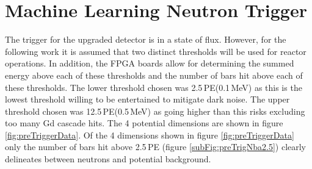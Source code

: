 \clearpage
\section{Machine Learning Neutron Trigger}\label{sec:MachineLearningTrigger}
The trigger for the upgraded detector is in a state of flux. However, for the following work it is assumed that two distinct thresholds will be used for reactor operations. In addition, the FPGA boards allow for determining the summed energy above each of these thresholds and the number of bars hit above each of these thresholds. The lower threshold chosen was 2.5\,PE(0.1\,MeV) as this is the lowest threshold willing to be entertained to mitigate dark noise. The upper threshold chosen was 12.5\,PE(0.5\,MeV) as going higher than this risks excluding too many Gd cascade hits. The 4 potential dimensions are shown in figure \ref{fig:preTriggerData}. Of the 4 dimensions shown in figure \ref{fig:preTriggerData} only the number of bars hit above 2.5\,PE (figure \ref{subFig:preTrigNba2.5}) clearly delineates between neutrons and potential background.  
